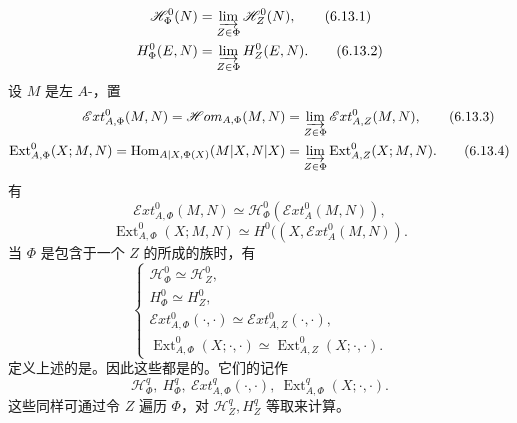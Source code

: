 \begin{align}\mathscr H_\Phi^0(N)&=\varinjlim_{Z\in\Phi}\mathscr H_Z^0(N),\tag{6.13.1}\\
H_\Phi^0(E,N)&=\varinjlim_{Z\in\Phi}H_Z^0(E,N).\tag{6.13.2}\end{align}
设 $M$ 是左 $A$-，置
\begin{align}\mathscr Ext_{A,\Phi}^0(M,N)=\mathscr Hom_{A,\Phi}(M,N)&=\varinjlim_{Z\in\Phi}\mathscr Ext_{A,Z}^0(M,N),\tag{6.13.3}\\
\operatorname{Ext}_{A,\Phi}^0(X;M,N)=\operatorname{Hom}_{A|X,\Phi(X)}(M|X,N|X)&=\varinjlim_{Z\in\Phi}\operatorname{Ext}_{A,Z}^0(X;M,N).\tag{6.13.4}\end{align}
有
\begin{equation}\mathscr Ext_{A,\Phi}^0(M,N)\simeq\mathscr H_\Phi^0(\mathscr Ext_A^0(M,N)),\tag{6.13.5}\end{equation}
\begin{equation}\operatorname{Ext}_{A,\Phi}^0(X;M,N)\simeq H^0((X,\mathscr Ext_A^0(M,N)).\tag{6.13.6}\end{equation}
当 $\Phi$ 是包含于一个 $Z$ 的所成的族时，有
\begin{equation}\begin{cases}\mathscr H_\Phi^0\simeq\mathscr H_Z^0,\\ H_\Phi^0\simeq H_Z^0,\\
\mathscr Ext_{A,\Phi}^0(\cdot,\cdot)\simeq\mathscr Ext_{A,Z}^0(\cdot,\cdot),\\
\operatorname{Ext}_{A,\Phi}^0(X;\cdot,\cdot)\simeq\operatorname{Ext}_{A,Z}^0(X;\cdot,\cdot).
\end{cases}\tag{6.13.7}\end{equation}
定义上述的是。因此这些都是的。它们的记作
\begin{equation}\mathscr H_\Phi^q,\ H_\Phi^q,\ \mathscr Ext_{A,\Phi}^q(\cdot,\cdot),\ \operatorname{Ext}_{A,\Phi}^q(X;\cdot,\cdot).\tag{6.13.8}\end{equation}
这些同样可通过令 $Z$ 遍历 $\Phi$，对 $\mathscr H_Z^q,H_Z^q$ 等取来计算。

